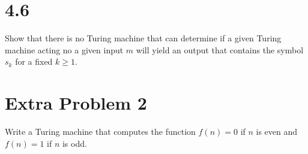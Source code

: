 \documentclass[10pt]{mypackage}
\begin{document}
\section{4.6}%
\begin{problem}
  Show that there is no Turing machine that can determine if a given Turing machine acting no a given input $m$ will yield an output that contains the symbol $s_k$ for a fixed $k\geq 1$.
\end{problem}
\section{Extra Problem 2}%
\begin{problem}
  Write a Turing machine that computes the function $f(n) = 0$ if $n$ is even and $f(n) = 1$ if $n$ is odd.
\end{problem}
\begin{solution}

\end{solution}
\end{document}
